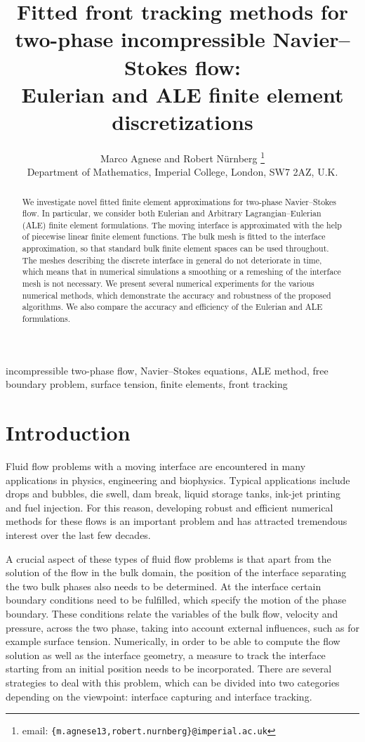 \documentclass[a4paper,12pt,onecolumn]{article}
\title{Fitted front tracking methods for two-phase incompressible
Navier--Stokes flow: \\
Eulerian and ALE finite element discretizations
}
\author{Marco Agnese and Robert N\"urnberg%
\thanks{email: \texttt{\{m.agnese13,robert.nurnberg\}@imperial.ac.uk}}\\
\small
Department of Mathematics, Imperial College, London, SW7 2AZ, U.K.}
\date{}
\newenvironment{keywords}{{\upshape\bfseries Key words. }\ignorespaces}{}
\begin{document}
\captionsetup[subfigure]{labelformat=empty} %

\maketitle

\begin{abstract}
We investigate novel fitted finite element approximations for two-phase
Navier--Stokes flow. In particular, we consider both Eulerian and
Arbitrary Lagrangian--Eulerian (ALE) finite element formulations.
The moving interface is approximated with the help of piecewise linear
finite element functions. The bulk mesh is fitted to the interface
approximation, so that standard bulk finite element spaces can be used
throughout.
The meshes describing the discrete interface in
general do not deteriorate in time, which means that in numerical simulations a
smoothing or a remeshing of the interface mesh is not necessary.
We present several numerical experiments for the various numerical methods,
which demonstrate the accuracy and robustness of the proposed algorithms.
We also compare the accuracy and efficiency of the Eulerian and ALE
formulations.
\end{abstract}

\begin{keywords}
incompressible two-phase flow, Navier--Stokes equations, ALE method,
free boundary problem, surface tension, finite elements, front tracking
\end{keywords}

\section{Introduction}\label{sec:introdution}
Fluid flow problems with a moving interface are encountered in many
applications in physics, engineering and biophysics. Typical applications
include drops and bubbles, die swell, dam break, liquid storage tanks,
ink-jet printing and fuel injection. For this reason, developing robust and
efficient numerical methods for these flows is an important problem and
has attracted tremendous interest over the last few decades.

A crucial aspect of these types of fluid flow problems is that apart from
the solution of the flow in the bulk domain, the position of the interface
separating the two bulk phases also needs to be determined.
At the interface certain boundary conditions need to be fulfilled, which
specify the motion of the phase boundary.
These conditions relate the variables of the bulk flow, velocity and pressure,
across the two phase, taking into account external influences, such as for
example surface tension. Numerically, in order
to be able to compute the flow solution as well as the interface
geometry, a measure to track the interface starting from an initial position
needs to be incorporated.
There are several strategies to deal with this problem, which can be divided
into two categories depending on the viewpoint: interface capturing and
interface tracking.
\end{document}
